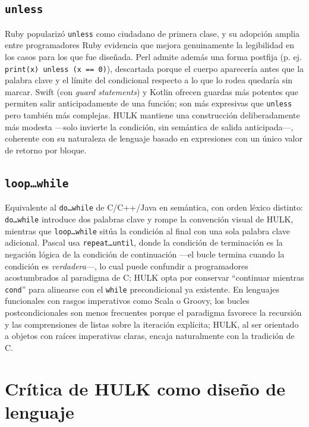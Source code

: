 \documentclass[11pt,a4paper]{article}
\begin{document}
\subsection{\texttt{unless}}

Ruby popularizó \texttt{unless} como ciudadano de primera clase, y su adopción amplia entre programadores Ruby evidencia que mejora genuinamente la legibilidad en los casos para los que fue diseñada. Perl admite además una forma postfija (p. ej. \texttt{print(x) unless (x == 0)}), descartada porque el cuerpo aparecería antes que la palabra clave y el límite del condicional respecto a lo que lo rodea quedaría sin marcar. Swift (con \emph{guard statements}) y Kotlin ofrecen guardas más potentes que permiten salir anticipadamente de una función; son más expresivas que \texttt{unless} pero también más complejas. HULK mantiene una construcción deliberadamente más modesta —solo invierte la condición, sin semántica de salida anticipada—, coherente con su naturaleza de lenguaje basado en expresiones con un único valor de retorno por bloque.

\subsection{\texttt{loop\ldots while}}

Equivalente al \texttt{do\ldots while} de C/C++/Java en semántica, con orden léxico distinto: \texttt{do\ldots while} introduce dos palabras clave y rompe la convención visual de HULK, mientras que \texttt{loop\ldots while} sitúa la condición al final con una sola palabra clave adicional. Pascal usa \texttt{repeat\ldots until}, donde la condición de terminación es la negación lógica de la condición de continuación —el bucle termina cuando la condición es \emph{verdadera}—, lo cual puede confundir a programadores acostumbrados al paradigma de C; HULK opta por conservar ``continuar mientras \texttt{cond}'' para alinearse con el \texttt{while} precondicional ya existente. En lenguajes funcionales con rasgos imperativos como Scala o Groovy, los bucles postcondicionales son menos frecuentes porque el paradigma favorece la recursión y las comprensiones de listas sobre la iteración explícita; HULK, al ser orientado a objetos con raíces imperativas claras, encaja naturalmente con la tradición de C.

\section{Crítica de HULK como diseño de lenguaje}
\end{document}
